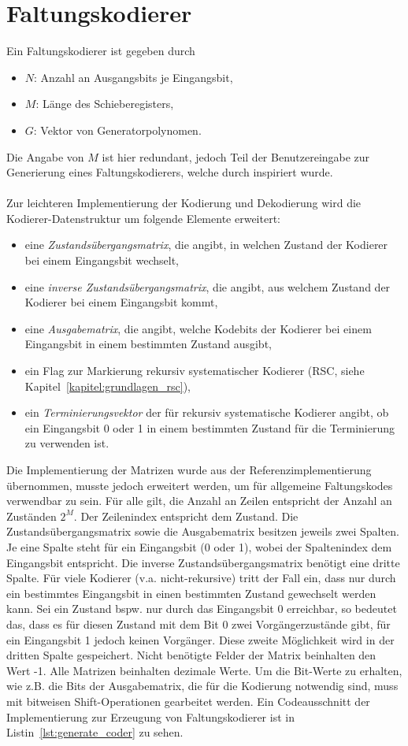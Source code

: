 \section{Faltungskodierer}
\label{kapitel:implementierung_faltungskodierer}
Ein Faltungskodierer ist gegeben durch 
\begin{itemize}
\item $N$: Anzahl an Ausgangsbits je Eingangsbit,
\item $M$: Länge des Schieberegisters,
\item $G$: Vektor von Generatorpolynomen.
\end{itemize}
Die Angabe von $M$ ist hier redundant, jedoch Teil der Benutzereingabe zur Generierung eines Faltungskodierers, welche durch \cite{morelos2006art} inspiriert wurde.
\\
\\
Zur leichteren Implementierung der Kodierung und Dekodierung wird die Kodierer-Datenstruktur um folgende Elemente erweitert:
\begin{itemize}
\item eine \emph{Zustandsübergangsmatrix}, die angibt, in welchen Zustand der Kodierer bei einem Eingangsbit wechselt,
\item eine \emph{inverse Zustandsübergangsmatrix}, die angibt, aus welchem Zustand der Kodierer bei einem Eingangsbit kommt,
\item eine \emph{Ausgabematrix}, die angibt, welche Kodebits der Kodierer bei einem Eingangsbit in einem bestimmten Zustand ausgibt,
\item ein Flag zur Markierung rekursiv systematischer Kodierer (RSC, siehe Kapitel~\ref{kapitel:grundlagen_rsc}),
\item ein \emph{Terminierungsvektor} der für rekursiv systematische Kodierer angibt, ob ein Eingangsbit 0 oder 1 in einem bestimmten Zustand für die Terminierung zu verwenden ist.
\end{itemize}
Die Implementierung der Matrizen wurde aus der Referenzimplementierung übernommen, musste jedoch erweitert werden, um für allgemeine Faltungskodes verwendbar zu sein. Für alle gilt, die Anzahl an Zeilen entspricht der Anzahl an Zuständen $2^{M}$. Der Zeilenindex entspricht dem Zustand. Die Zustandsübergangsmatrix sowie die Ausgabematrix besitzen jeweils zwei Spalten. Je eine Spalte steht für ein Eingangsbit (0 oder 1), wobei der Spaltenindex dem Eingangsbit entspricht. Die inverse Zustandsübergangsmatrix benötigt eine dritte Spalte. Für viele Kodierer (v.a. nicht-rekursive) tritt der Fall ein, dass nur durch ein bestimmtes Eingangsbit in einen bestimmten Zustand gewechselt werden kann. Sei ein Zustand bspw. nur durch das Eingangsbit 0 erreichbar, so bedeutet das, dass es für diesen Zustand mit dem Bit 0 zwei Vorgängerzustände gibt, für ein Eingangsbit 1 jedoch keinen Vorgänger. Diese zweite Möglichkeit wird in der dritten Spalte gespeichert. Nicht benötigte Felder der Matrix beinhalten den Wert -1. Alle Matrizen beinhalten dezimale Werte. Um die Bit-Werte zu erhalten, wie z.B. die Bits der Ausgabematrix, die für die Kodierung notwendig sind, muss mit bitweisen Shift-Operationen gearbeitet werden. Ein Codeausschnitt der Implementierung zur Erzeugung von Faltungskodierer ist in Listin~\ref{lst:generate_coder} zu sehen.
